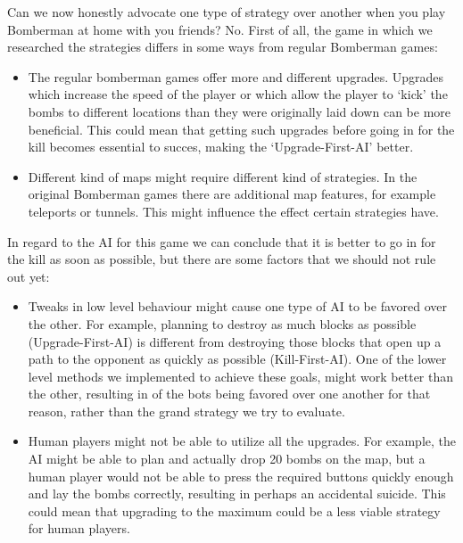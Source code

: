 %
Can we now honestly advocate one type of strategy over another when you play
Bomberman at home with you friends? No.
First of all, the game in which we researched the strategies differs in some
ways from regular Bomberman games:
\begin{itemize}
\item The regular bomberman games offer more and different upgrades. Upgrades which increase
the speed of the player or which allow the player to `kick' the bombs to different
locations than they were originally laid down can be more beneficial. This could
mean that getting such upgrades before going in for the kill becomes essential
to succes, making the `Upgrade-First-AI' better.
\item Different kind of maps might require different kind of strategies. In
the original Bomberman games there are additional map features, for example
teleports or tunnels. This might influence the effect certain strategies have.
\end{itemize}

In regard to the AI for this game we can conclude that it is better to go in
for the kill as soon as possible, but there are some factors that we should
not rule out yet:
\begin{itemize}
\item Tweaks in low level behaviour might cause one type of AI to be favored over the
other. For example, planning to destroy as much blocks as possible
(Upgrade-First-AI) is different from destroying those blocks that open up
a path to the opponent as quickly as possible (Kill-First-AI). One of the
lower level methods we implemented to achieve these goals, might work better
than the other, resulting in of the bots being favored over one another for that
reason, rather than the grand strategy we try to evaluate.
\item Human players might not be able to utilize all the upgrades. For example,
the AI might be able to plan and actually drop 20 bombs on the map, but a human player
would not be able to press the required buttons quickly enough and lay the bombs correctly, resulting
in perhaps an accidental suicide. This could mean that upgrading to the maximum
could be a less viable strategy for human players.
\end{itemize}

